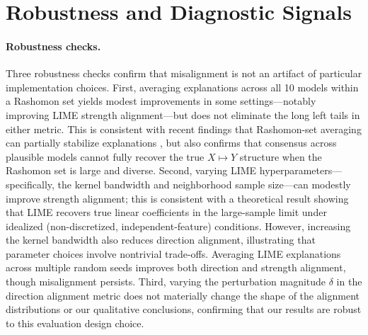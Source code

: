 \documentclass[11pt]{article}
\begin{document}
\vspace{-0.1cm}
\section{Robustness and Diagnostic Signals}\vspace{-0.1cm}

\paragraph{Robustness checks.}
Three robustness checks confirm that misalignment is not an artifact of particular implementation choices. First, averaging explanations across all 10 models within a Rashomon set yields modest improvements in some settings---notably improving LIME strength alignment---but does not eliminate the long left tails in either metric. This is consistent with recent findings that Rashomon-set averaging can partially stabilize explanations \citep{donnelly2023rashomon}, but also confirms that consensus across plausible models cannot fully recover the true $X \mapsto Y$ structure when the Rashomon set is large and diverse. Second, varying LIME hyperparameters---specifically, the kernel bandwidth and neighborhood sample size---can modestly improve strength alignment; this is consistent with a theoretical result showing that LIME recovers true linear coefficients in the large-sample limit under idealized (non-discretized, independent-feature) conditions. However, increasing the kernel bandwidth also reduces direction alignment, illustrating that parameter choices involve nontrivial trade-offs. Averaging LIME explanations across multiple random seeds improves both direction and strength alignment, though misalignment persists. Third, varying the perturbation magnitude $\delta$ in the direction alignment metric does not materially change the shape of the alignment distributions or our qualitative conclusions, confirming that our results are robust to this evaluation design choice.
\vspace{-0.5cm}
\end{document}
